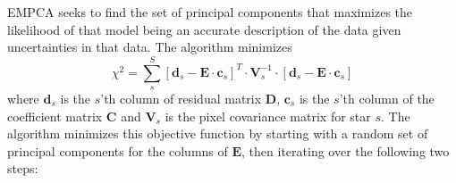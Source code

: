 \documentclass[a4paper,fleqn,usenatbib]{mnras}
\begin{document}
EMPCA seeks to find the set of principal components that maximizes the likelihood of that model being an accurate description of the data given uncertainties in that data.  The algorithm minimizes
\begin{equation}
	\chi^2 = \sum_s^S\left[\mathbf{d}_s - \mathbf{E}\cdot\mathbf{c}_{s}\right]^T\cdot\mathbf{V}_{s}^{-1}\cdot\left[\mathbf{d}_s - \mathbf{E}\cdot\mathbf{c}_{s}\right]
	\label{eqn:chisquared}
\end{equation}
where $\mathbf{d}_s$ is the $s$'th column of residual matrix $\mathbf{D}$, $\mathbf{c}_s$ is the $s$'th column of the coefficient matrix $\mathbf{C}$ and $\mathbf{V}_{s}$ is the pixel covariance matrix for star $s$. The algorithm minimizes this objective function by starting with a random set of principal components for the columns of $\mathbf{E}$, then iterating over the following two steps:
%
\end{document}
